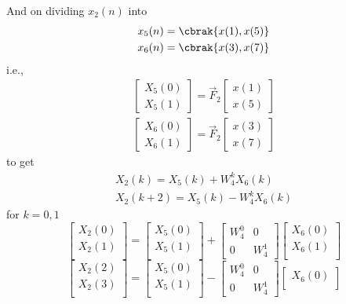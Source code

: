 \documentclass[journal,12pt,twocolumn]{IEEEtran}
\newcommand{\mymat}[1]{\ensuremath{\begin{bmatrix}#1\end{bmatrix}}}
\renewcommand\thesection{\arabic{section}}
\begin{document}
\begin{enumerate}[label=\arabic*.,ref=\thesection.\theenumi]
	And on dividing $x_2(n)$ into
	\begin{align}
		x_5(n) = \cbrak{x(1), x(5)} \\
		x_6(n) = \cbrak{x(3), x(7)}
	\end{align}
	i.e.,
	\begin{align}
		\mymat{X_5(0) \\ X_5(1)} = \vec{F}_2 \mymat{x(1) \\ x(5)} \\
		\mymat{X_6(0) \\ X_6(1)} = \vec{F}_2 \mymat{x(3) \\ x(7)}
	\end{align}
	to get
	\begin{align}
		X_2(k) = X_5(k) + W_4^k X_6(k) \\
		X_2(k + 2) = X_5(k) - W_4^k X_6(k) 
	\end{align}
	for $k = 0, 1$
\begin{equation}
\begin{bmatrix}
X_{2}(0) \\ 
X_{2}(1)\\ 
\end{bmatrix}
=
\begin{bmatrix}
X_{5}(0) \\ 
X_{5}(1)\\ 
\end{bmatrix}
+
\begin{bmatrix}
W^{0}_{4} & 0\\
0 & W^{1}_{4}
\end{bmatrix}
\begin{bmatrix}
X_{6}(0) \\ 
X_{6}(1) \\ 
\end{bmatrix}
\end{equation}
\begin{equation}
\begin{bmatrix}
X_{2}(2) \\ 
X_{2}(3)\\ 
\end{bmatrix}
=
\begin{bmatrix}
X_{5}(0) \\ 
X_{5}(1)\\ 
\end{bmatrix}
-
\begin{bmatrix}
W^{0}_{4} & 0\\
0 & W^{1}_{4}
\end{bmatrix}
\begin{bmatrix}
X_{6}(0) \\ 

\end{bmatrix}
\end{equation}
\end{enumerate}
\end{document}
